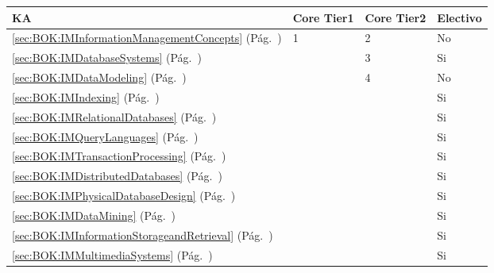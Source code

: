 \begin{center}
\begin{tabularx}{\textwidth}{|X|p{1cm}|p{1cm}|p{1.4cm}|}\hline
\textbf{\acf{KA}} & \textbf{Core Tier1} & \textbf{Core Tier2} & \textbf{Electivo} \\ \hline
\ref{sec:BOK:IMInformationManagementConcepts} \htmlref{\IMInformationManagementConcepts}{sec:BOK:IMInformationManagementConcepts}\xspace (Pág.~\pageref{sec:BOK:IMInformationManagementConcepts}) & 1 & 2 & No \\ \hline
\ref{sec:BOK:IMDatabaseSystems} \htmlref{\IMDatabaseSystems}{sec:BOK:IMDatabaseSystems}\xspace (Pág.~\pageref{sec:BOK:IMDatabaseSystems}) & ~ & 3 & Si \\ \hline
\ref{sec:BOK:IMDataModeling} \htmlref{\IMDataModeling}{sec:BOK:IMDataModeling}\xspace (Pág.~\pageref{sec:BOK:IMDataModeling}) & ~ & 4 & No \\ \hline
\ref{sec:BOK:IMIndexing} \htmlref{\IMIndexing}{sec:BOK:IMIndexing}\xspace (Pág.~\pageref{sec:BOK:IMIndexing}) & ~ & ~ & Si \\ \hline
\ref{sec:BOK:IMRelationalDatabases} \htmlref{\IMRelationalDatabases}{sec:BOK:IMRelationalDatabases}\xspace (Pág.~\pageref{sec:BOK:IMRelationalDatabases}) & ~ & ~ & Si \\ \hline
\ref{sec:BOK:IMQueryLanguages} \htmlref{\IMQueryLanguages}{sec:BOK:IMQueryLanguages}\xspace (Pág.~\pageref{sec:BOK:IMQueryLanguages}) & ~ & ~ & Si \\ \hline
\ref{sec:BOK:IMTransactionProcessing} \htmlref{\IMTransactionProcessing}{sec:BOK:IMTransactionProcessing}\xspace (Pág.~\pageref{sec:BOK:IMTransactionProcessing}) & ~ & ~ & Si \\ \hline
\ref{sec:BOK:IMDistributedDatabases} \htmlref{\IMDistributedDatabases}{sec:BOK:IMDistributedDatabases}\xspace (Pág.~\pageref{sec:BOK:IMDistributedDatabases}) & ~ & ~ & Si \\ \hline
\ref{sec:BOK:IMPhysicalDatabaseDesign} \htmlref{\IMPhysicalDatabaseDesign}{sec:BOK:IMPhysicalDatabaseDesign}\xspace (Pág.~\pageref{sec:BOK:IMPhysicalDatabaseDesign}) & ~ & ~ & Si \\ \hline
\ref{sec:BOK:IMDataMining} \htmlref{\IMDataMining}{sec:BOK:IMDataMining}\xspace (Pág.~\pageref{sec:BOK:IMDataMining}) & ~ & ~ & Si \\ \hline
\ref{sec:BOK:IMInformationStorageandRetrieval} \htmlref{\IMInformationStorageandRetrieval}{sec:BOK:IMInformationStorageandRetrieval}\xspace (Pág.~\pageref{sec:BOK:IMInformationStorageandRetrieval}) & ~ & ~ & Si \\ \hline
\ref{sec:BOK:IMMultimediaSystems} \htmlref{\IMMultimediaSystems}{sec:BOK:IMMultimediaSystems}\xspace (Pág.~\pageref{sec:BOK:IMMultimediaSystems}) & ~ & ~ & Si \\ \hline
\end{tabularx}
\end{center}
